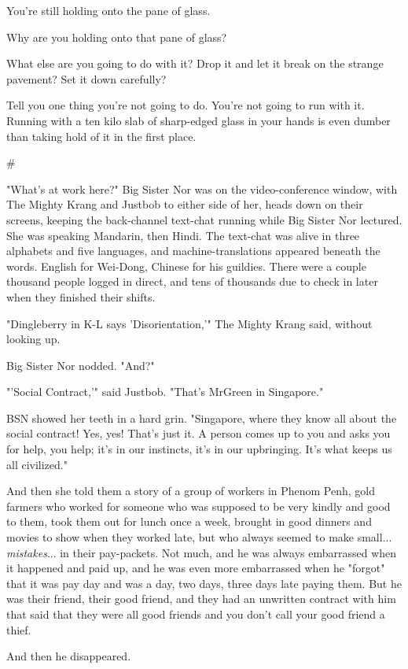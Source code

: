 You're still holding onto the pane of glass.

Why are you holding onto that pane of glass?

What else are you going to do with it? Drop it and let it break on
the strange pavement? Set it down carefully?

Tell you one thing you're not going to do. You're not going to run
with it. Running with a ten kilo slab of sharp-edged glass in your
hands is even dumber than taking hold of it in the first place.

\#

"What's at work here?" Big Sister Nor was on the video-conference
window, with The Mighty Krang and Justbob to either side of her,
heads down on their screens, keeping the back-channel text-chat
running while Big Sister Nor lectured. She was speaking Mandarin,
then Hindi. The text-chat was alive in three alphabets and five
languages, and machine-translations appeared beneath the words.
English for Wei-Dong, Chinese for his guildies. There were a couple
thousand people logged in direct, and tens of thousands due to
check in later when they finished their shifts.

"Dingleberry in K-L says 'Disorientation,'" The Mighty Krang said,
without looking up.

Big Sister Nor nodded. "And?"

"'Social Contract,'" said Justbob. "That's MrGreen in Singapore."

BSN showed her teeth in a hard grin. "Singapore, where they know
all about the social contract! Yes, yes! That's just it. A person
comes up to you and asks you for help, you help; it's in our
instincts, it's in our upbringing. It's what keeps us all
civilized."

And then she told them a story of a group of workers in Phenom
Penh, gold farmers who worked for someone who was supposed to be
very kindly and good to them, took them out for lunch once a week,
brought in good dinners and movies to show when they worked late,
but who always seemed to make small... \emph{mistakes}... in their
pay-packets. Not much, and he was always embarrassed when it
happened and paid up, and he was even more embarrassed when he
"forgot" that it was pay day and was a day, two days, three days
late paying them. But he was their friend, their good friend, and
they had an unwritten contract with him that said that they were
all good friends and you don't call your good friend a thief.

And then he disappeared.

